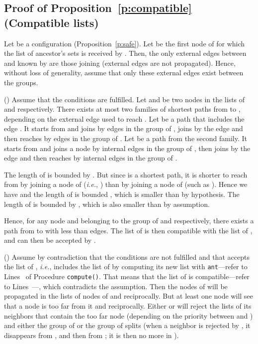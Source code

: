 \documentclass[11pt,english]{article}
\newcommand{\Latin}[1]{\textit{#1}}
\newcommand{\ie}{\Latin{i.e.},\xspace}
\newenvironment{proof}[1][0cm]{
  \begin{list}{\bf Proof.~}{
      \setlength{\itemindent}{0cm}
      \setlength{\labelsep}{0cm}
      \setlength{\labelwidth}{#1}
      \setlength{\leftmargin}{#1}
    \item
    }
}{\hfill
  \end{list}
}
\begin{document}
\subsection{Proof of Proposition~\ref{p:compatible} (Compatible lists)}
\begin{proof}
  Let  be a configuration (Proposition~\ref{p:safe}).
  Let  be the first node of  for which the list of ancestor's sets is
  received by . Then, the only external edges between  and 
  known by  are those joining  (external edges are not propagated). Hence,
  without loss of generality, assume that only these external edges exist
  between the groups.

  \noindent () Assume that the conditions are fulfilled.
Let  and  be two nodes in the lists of  and 
  respectively. There exists at most two families of shortest paths from  to
  , depending on the external edge used to reach .
Let  be a path that includes the edge . It starts from  and
  joins  by  edges in the group of , joins  by the edge  and
  then reaches  by  edges in the group of .
Let  be a path from the second family. It starts from  and joins a
  node  by  internal edges in the group of , then joins
   by the edge  and then reaches  by  internal edges in the
  group of .

  The length of  is bounded by .  But since  is a shortest
  path, it is shorter to reach  from  by joining a node of  (\ie
  ) than by joining a node of  (such as ). Hence we have  and the length of  is bounded , which is smaller than
   by hypothesis.
The length of  is bounded by , which is also smaller than
   by assumption.

  Hence, for any node  and  belonging to the group of  and 
  respectively, there exists a path from  to  with less than
   edges. The list of  is then compatible with the list of
  , and can then be accepted by .

  \noindent () Assume by contradiction that the conditions are not
  fulfilled and that  accepts the list of , \ie  includes the list of
   by computing its new list with \texttt{ant}---refer to Lines~ of
  Procedure \texttt{compute()}.  That means that the list of  is
  compatible---refer to Lines~---, which contradicts the assumption.  Then
  the nodes of  will be propagated in the lists of nodes of
   and reciprocally. But at least one node  will see that a node  is too
  far from it and reciprocally. Either  or  will reject the lists of its
  neighbors that contain the too far node (depending on the priority between 
  and ) and either the group of  or the group of  splits (when a
  neighbor is rejected by , it disappears from , and then
  from ; it is then no more in ).
\end{proof}
\end{document}
